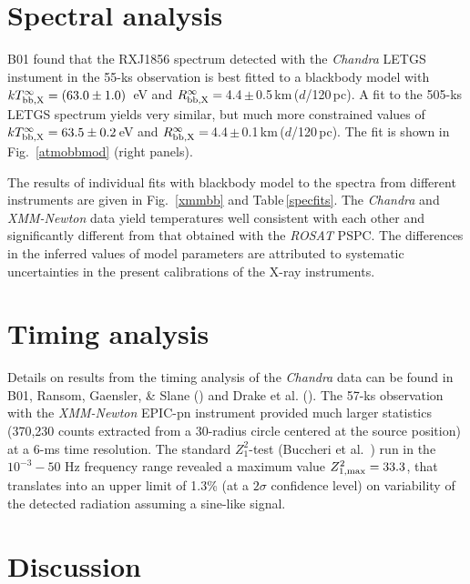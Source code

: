 \documentclass[twocolumn]{aa}
\newcommand{\modi}[1]{{#1}}
\begin{document}
\section{Spectral analysis}

B01 found that the RXJ1856 spectrum detected with the {\em Chandra} 
LETGS instument in the 55-ks observation is best fitted to a blackbody
model with  $kT_{\rm bb,X}^\infty= (63.0 \pm 1.0)$~eV and
$R_{\rm bb,X}^\infty=$\,4.4\,$\pm$\,0.5\,km\,($d$/120\,pc).
A fit to the 505-ks LETGS spectrum yields very similar,
but much more constrained values of $kT_{\rm bb,X}^\infty =63.5\pm 0.2$\,eV
and $R_{\rm bb,X}^\infty=$\,4.4\,$\pm$\,0.1\,km\,($d$/120\,pc). 
The fit is shown in Fig.~\ref{atmobbmod} (right panels).

The results of individual fits with blackbody model to the spectra 
from different instruments are given in \modi{Fig.~\ref{xmmbb} and} 
Table\,\ref{specfits}.
The {\sl Chandra} and {\sl XMM-Newton} data yield temperatures well 
consistent with each other and significantly different from that 
obtained with the {\sl ROSAT} PSPC.
The differences in the inferred values of model parameters
are attributed to systematic uncertainties in the present
calibrations of the X-ray instruments. 

\section{Timing analysis}

Details on results from the timing analysis of the {\em Chandra}
data can be found in B01, Ransom, Gaensler, \& Slane (\cite{RanGaeSla02}) 
and Drake et al. (\cite{Draetal02}).
The 57-ks observation with the {\em XMM-Newton} EPIC-pn instrument 
provided much larger statistics (370,230 counts extracted from a 
30\arcsec -radius circle centered at the source position) at a 6-ms time 
resolution.
The standard $Z^2_1$-test (Buccheri et al.~\cite{Bucetal83}) run
in the $10^{-3}-50$ Hz frequency range revealed a maximum value
$Z^2_{1,{\rm max}}=33.3$, that translates into an upper limit of
1.3\% (at a $2\sigma$ confidence level) on variability of the 
detected radiation assuming a sine-like signal.


\section{Discussion}
\end{document}
